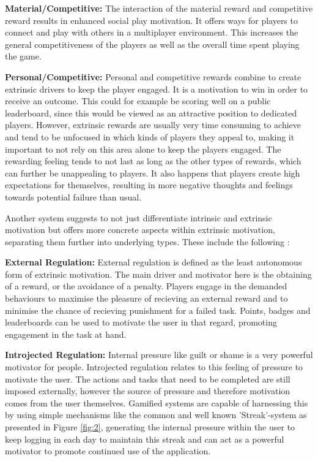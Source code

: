 \textbf{Material/Competitive:}
The interaction of the material reward and competitive reward results in enhanced social play motivation. It offers ways for players to connect and play with others in a multiplayer environment. This increases the general competitiveness of the players as well as the overall time spent playing the game.

\textbf{Personal/Competitive:}
Personal and competitive rewards combine to create extrinsic drivers to keep the player engaged. It is a motivation to win in order to receive an outcome. This could for example be scoring well on a public leaderboard, since this would be viewed as an attractive position to dedicated players. However, extrinsic rewards are usually very time consuming to achieve and tend to be unfocused in which kinds of players they appeal to, making it important to not rely on this area alone to keep the players engaged. The rewarding feeling tends to not last as long as the other types of rewards, which can further be unappealing to players. It also happens that players create high expectations for themselves, resulting in more negative thoughts and feelings towards potential failure than usual.

Another system suggests to not just differentiate intrinsic and extrinsic motivation but offers more concrete aspects within extrinsic motivation, separating them further into underlying types. These include the following \cite{equilibrium}:

\textbf{External Regulation:}
External regulation is defined as the least autonomous form of extrinsic motivation. The main driver and motivator here is the obtaining of a reward, or the avoidance of a penalty. Players engage in the demanded behaviours to maximise the pleasure of recieving an external reward and to minimise the chance of recieving punishment for a failed task. Points, badges and leaderboards can be used to motivate the user in that regard, promoting engagement in the task at hand.

\textbf{Introjected Regulation:}
Internal pressure like guilt or shame is a very powerful motivator for people. Introjected regulation relates to this feeling of pressure to motivate the user. The actions and tasks that need to be completed are still imposed externally, however the source of pressure and therefore motivation comes from the user themselves. Gamified systems are capable of harnessing this by using simple mechanisms like the common and well known 'Streak'-system as presented in Figure \ref{fig:2}, generating the internal pressure within the user to keep logging in each day to maintain this streak and can act as a powerful motivator to promote continued use of the application.

